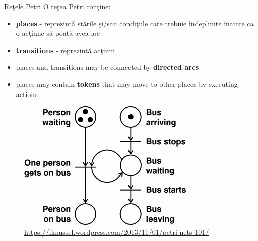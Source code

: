 \documentclass{beamer}
\begin{document}
\begin{frame}{Reţele Petri}
O reţea Petri conţine:

\begin{itemize}
\item
\textbf{places} - reprezintă stările şi/sau condiţiile care trebuie îndeplinite înainte ca o acţiune să poată avea loc
\item
\textbf{transitions} - reprezintă acţiuni
\item
places and transitions may be connected by \textbf{directed arcs}
\item
places may contain \textbf{tokens} that may move to other places by executing actions
\end{itemize}

\vspace{0.5cm}

\begin{figure}
\includegraphics[scale=0.4]{images/pn_bus}
\caption{\label{fig:pn_bus}\url{https://fknussel.wordpress.com/2013/11/01/petri-nets-101/}}
\end{figure}


\end{frame}
\end{document}
